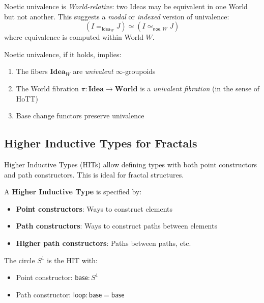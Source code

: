 \begin{remark}
\label{rem:univalence-worlds}
Noetic univalence is \emph{World-relative}: two Ideas may be equivalent in
one World but not another. This suggests a \emph{modal} or \emph{indexed}
version of univalence:
\[
  (I =_{\mathsf{Idea}_W} J) \simeq (I \simeq_{\mathsf{noe},W} J)
\]
where equivalence is computed within World $W$.
\end{remark}

\begin{proposition}
\label{prop:univalence-fibered}
Noetic univalence, if it holds, implies:
\begin{enumerate}
  \item The fibers $\mathbf{Idea}_W$ are \emph{univalent} $\infty$-groupoids
  \item The World fibration $\pi : \mathbf{Idea} \to \mathbf{World}$ is a
        \emph{univalent fibration} (in the sense of HoTT)
  \item Base change functors preserve univalence
\end{enumerate}
\end{proposition}

\subsection{Higher Inductive Types for Fractals}
\label{subsec:hits-fractals}

Higher Inductive Types (HITs) allow defining types with both point constructors
and path constructors. This is ideal for fractal structures.

\begin{definition}
\label{def:hit}
A \textbf{Higher Inductive Type} is specified by:
\begin{itemize}
  \item \textbf{Point constructors}: Ways to construct elements
  \item \textbf{Path constructors}: Ways to construct paths between elements
  \item \textbf{Higher path constructors}: Paths between paths, etc.
\end{itemize}
\end{definition}

\begin{example}
\label{ex:circle-hit}
The circle $S^1$ is the HIT with:
\begin{itemize}
  \item Point constructor: $\mathsf{base} : S^1$
  \item Path constructor: $\mathsf{loop} : \mathsf{base} = \mathsf{base}$
\end{itemize}
\end{example}

